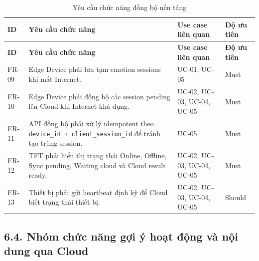 \documentclass[12pt,a4paper]{article}
\begin{document}
\begin{center}
\scriptsize
\begin{longtable}{|P{0.12\textwidth}|P{0.44\textwidth}|P{0.24\textwidth}|P{0.12\textwidth}|}
\caption{Yêu cầu chức năng đồng bộ nền tảng}\\
\hline
\textbf{ID} & \textbf{Yêu cầu chức năng} & \textbf{Use case liên quan} & \textbf{Độ ưu tiên} \\
\hline
\endfirsthead
\hline
\textbf{ID} & \textbf{Yêu cầu chức năng} & \textbf{Use case liên quan} & \textbf{Độ ưu tiên} \\
\hline
\endhead
FR-09 & Edge Device phải lưu tạm emotion sessions khi mất Internet. & UC-01, UC-05 & Must \\
\hline
FR-10 & Edge Device phải đồng bộ các session pending lên Cloud khi Internet khả dụng. & UC-02, UC-03, UC-04, UC-05 & Must \\
\hline
FR-11 & API đồng bộ phải xử lý idempotent theo \texttt{device\_id + client\_session\_id} để tránh tạo trùng session. & UC-05 & Must \\
\hline
FR-12 & TFT phải hiển thị trạng thái Online, Offline, Sync pending, Waiting cloud và Cloud result ready. & UC-02, UC-03, UC-04, UC-05 & Must \\
\hline
FR-13 & Thiết bị phải gửi heartbeat định kỳ để Cloud biết trạng thái thiết bị. & UC-02, UC-03, UC-04, UC-05 & Should \\
\hline
\end{longtable}
\normalsize
\end{center}

\subsection*{6.4. Nhóm chức năng gợi ý hoạt động và nội dung qua Cloud}
\end{document}
